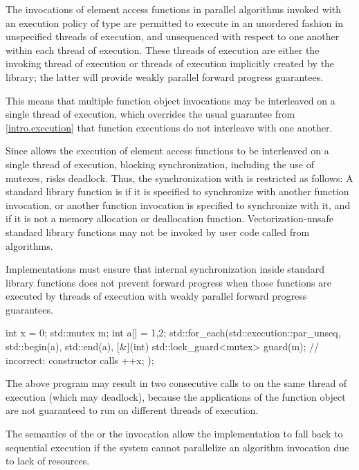\pnum
The invocations of element access functions in parallel algorithms invoked with
an execution policy of type  are
permitted to execute
in an unordered fashion in unspecified threads of execution, and
unsequenced with respect to one another within each thread of execution.
These threads of execution are
either the invoking thread of execution
or threads of execution implicitly created by the library;
the latter will provide weakly parallel forward progress guarantees.
\begin{note}
This means that multiple function object invocations may be interleaved
on a single thread of execution,
which overrides the usual guarantee from \ref{intro.execution}
that function executions do not interleave with one another.
\end{note}
Since  allows
the execution of element access functions
to be interleaved on a single thread of execution,
blocking synchronization, including the use of mutexes, risks deadlock.
Thus, the synchronization with 
is restricted as follows:
A standard library function is 
if it is specified to synchronize with another function invocation, or
another function invocation is specified to synchronize with it, and
if it is not a memory allocation or deallocation function.
Vectorization-unsafe standard library functions may not be invoked by user code
called from  algorithms.
\begin{note}
Implementations must ensure
that internal synchronization inside standard library functions
does not prevent forward progress
when those functions are executed
by threads of execution with weakly parallel forward progress guarantees.
\end{note}
\begin{example}
\begin{codeblock}
int x = 0;
std::mutex m;
int a[] = {1,2};
std::for_each(std::execution::par_unseq, std::begin(a), std::end(a), [&](int) {
  std::lock_guard<mutex> guard(m); // incorrect:  constructor calls 
  ++x;
});
\end{codeblock}
The above program may result in two consecutive calls to 
on the same thread of execution (which may deadlock),
because the applications of the function object are not guaranteed
to run on different threads of execution.
\end{example}
\begin{note}
The semantics of the  or
the  invocation
allow the implementation to fall back to sequential execution
if the system cannot parallelize an algorithm invocation
due to lack of resources.
\end{note}

